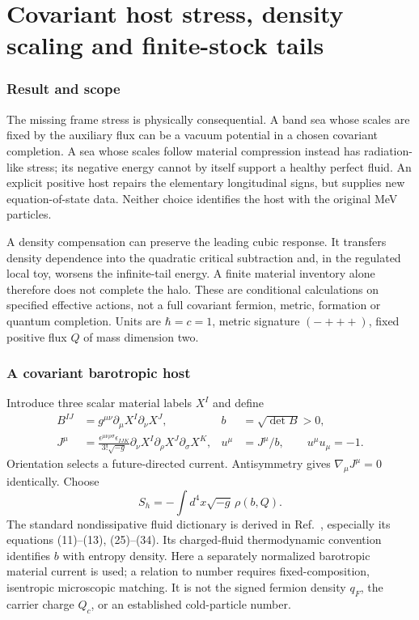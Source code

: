 \documentclass[11pt]{article}
\begin{document}
\clearpage

\part{Covariant host stress, density scaling and finite-stock tails}

\section{Result and scope}
The missing frame stress is physically consequential. A band sea whose scales
are fixed by the auxiliary flux can be a vacuum potential in a chosen
covariant completion. A sea whose scales follow material compression instead
has radiation-like stress; its negative energy cannot by itself support a
healthy perfect fluid. An explicit positive host repairs the elementary
longitudinal signs, but supplies new equation-of-state data. Neither choice
identifies the host with the original MeV particles.

A density compensation can preserve the leading cubic response. It transfers
density dependence into the quadratic critical subtraction and, in the
regulated local toy, worsens the infinite-tail energy. A finite material
inventory alone therefore does not complete the halo. These are conditional
calculations on specified effective actions, not a full covariant fermion,
metric, formation or quantum completion. Units are $\hbar=c=1$, metric
signature $(-+++)$, fixed positive flux $Q$ of mass dimension two.

\section{A covariant barotropic host}
Introduce three scalar material labels $X^I$ and define
\begin{align}
 B^{IJ}&=g^{\mu\nu}\partial_\mu X^I\partial_\nu X^J,&
 b&=\sqrt{\det B}>0,\\
 J^\mu&=\frac{\epsilon^{\mu\nu\rho\sigma}\epsilon_{IJK}}
 {3!\sqrt{-g}}\partial_\nu X^I\partial_\rho X^J\partial_\sigma X^K,
 &u^\mu&=J^\mu/b,\qquad u^\mu u_\mu=-1.
\end{align}
Orientation selects a future-directed current. Antisymmetry gives
$\nabla_\mu J^\mu=0$ identically. Choose
\begin{equation}
 S_h=-\int d^4x\sqrt{-g}\,\rho(b,Q).
\end{equation}
The standard nondissipative fluid dictionary is derived in
Ref.~\cite{MFfluid}, especially its equations (11)--(13), (25)--(34).
Its charged-fluid thermodynamic convention identifies $b$ with entropy
density. Here a separately normalized barotropic material current is used;
a relation to number requires fixed-composition, isentropic microscopic
matching. It is not the signed fermion density $q_F$, the carrier charge
$Q_c$, or an established cold-particle number.
\end{document}
